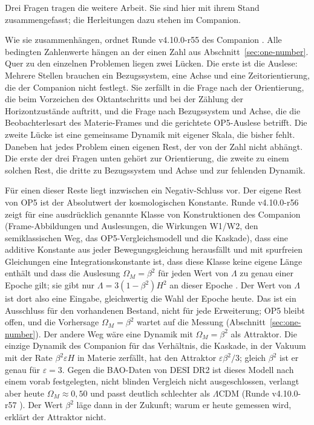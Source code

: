 Drei Fragen tragen die weitere Arbeit. Sie sind hier mit ihrem Stand zusammengefasst; die Herleitungen dazu stehen im Companion.

Wie sie zusammenhängen, ordnet Runde v4.10.0-r55 des Companion \cite{crossmap,layers}. Alle bedingten Zahlenwerte hängen an der einen Zahl aus
Abschnitt~\ref{sec:one-number}. Quer zu den einzelnen Problemen liegen zwei Lücken. Die erste ist die Auslese: Mehrere Stellen brauchen ein
Bezugssystem, eine Achse und eine Zeitorientierung, die der Companion nicht festlegt. Sie zerfällt in die Frage nach der Orientierung, die
beim Vorzeichen des Oktantschritts und bei der Zählung der Horizontzustände auftritt, und die Frage nach Bezugssystem und Achse, die die
Beobachterlesart des Materie-Frames und die gerichtete OP5-Auslese betrifft. Die zweite Lücke ist eine gemeinsame Dynamik mit eigener Skala,
die bisher fehlt. Daneben hat jedes Problem einen eigenen Rest, der von der Zahl nicht abhängt. Die erste der drei Fragen unten gehört zur
Orientierung, die zweite zu einem solchen Rest, die dritte zu Bezugssystem und Achse und zur fehlenden Dynamik.

Für einen dieser Reste liegt inzwischen ein Negativ-Schluss vor. Der eigene Rest von OP5 ist der Absolutwert der kosmologischen
Konstante. Runde v4.10.0-r56 zeigt für eine ausdrücklich genannte Klasse von Konstruktionen des Companion (Frame-Abbildungen und
Auslesungen, die Wirkungen W1/W2, den semiklassischen Weg, das OP5-Vergleichsmodell und die Kaskade), dass eine additive Konstante aus
jeder Bewegungsgleichung herausfällt und mit spurfreien Gleichungen eine Integrationskonstante ist, dass diese Klasse keine eigene Länge
enthält und dass die Auslesung \(\Omega_M=\beta^2\) für jeden Wert von \(\Lambda\) zu genau einer Epoche gilt; sie gibt nur
\(\Lambda=3(1-\beta^2)H^2\) an dieser Epoche \cite{lambdainput}. Der Wert von \(\Lambda\) ist dort also eine Eingabe, gleichwertig die Wahl
der Epoche \glqq heute\grqq{}. Das ist ein Ausschluss für den vorhandenen Bestand, nicht für jede Erweiterung; OP5 bleibt offen, und die
Vorhersage \(\Omega_M=\beta^2\) wartet auf die Messung (Abschnitt~\ref{sec:one-number}).
Der andere Weg wäre eine Dynamik mit \(\Omega_M=\beta^2\) als Attraktor. Die einzige Dynamik des Companion für das Verhältnis, die Kaskade,
in der Vakuum mit der Rate \(\beta^2\varepsilon H\) in Materie zerfällt, hat den Attraktor \(\varepsilon\beta^2/3\); gleich \(\beta^2\) ist er genau für
\(\varepsilon=3\). Gegen die BAO-Daten von DESI DR2 ist dieses Modell nach einem vorab festgelegten, nicht blinden Vergleich nicht
ausgeschlossen, verlangt aber heute \(\Omega_M\approx0{,}50\) und passt deutlich schlechter als \(\Lambda\)CDM (Runde v4.10.0-r57 \cite{layers}).
Der Wert \(\beta^2\) läge dann in der Zukunft; warum er heute gemessen wird, erklärt der Attraktor nicht.


